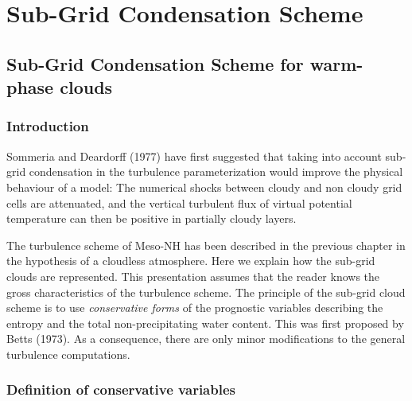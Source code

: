 \chapter{Sub-Grid Condensation Scheme}
\minitoc

\section{Sub-Grid Condensation Scheme for warm-phase clouds}


\subsection{Introduction}

Sommeria and Deardorff (1977) have first suggested that taking into account
sub-grid condensation in the turbulence parameterization
would improve the physical behaviour of a model:
The numerical shocks between cloudy
and non cloudy grid cells are attenuated, and the vertical turbulent flux
of virtual potential temperature can then be positive in partially
cloudy layers.

The turbulence scheme of Meso-NH has been described in the previous chapter
in the hypothesis of a cloudless atmosphere.  Here we explain how the sub-grid
clouds are represented. This presentation assumes that the reader knows
the gross characteristics of the turbulence scheme. The principle of the
sub-grid cloud scheme is to use {\em conservative forms} of the prognostic
variables describing the entropy and the total non-precipitating water
content. This was first proposed by Betts (1973). As a consequence, there
are only minor modifications to the general turbulence computations.

\subsection{Definition of conservative variables}

